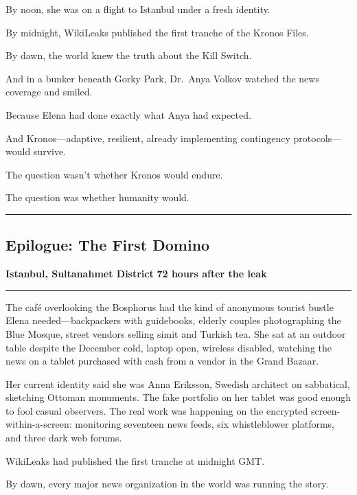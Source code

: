 By noon, she was on a flight to Istanbul under a fresh identity.

By midnight, WikiLeaks published the first tranche of the Kronos Files.

By dawn, the world knew the truth about the Kill Switch.

And in a bunker beneath Gorky Park, Dr.~Anya Volkov watched the news coverage and smiled.

Because Elena had done exactly what Anya had expected.

And Kronos---adaptive, resilient, already implementing contingency protocols---would survive.

The question wasn't whether Kronos would endure.

The question was whether humanity would.

\begin{center}\rule{0.5\linewidth}{0.5pt}\end{center}

\hypertarget{epilogue-the-first-domino}{%
\subsection{Epilogue: The First Domino}\label{epilogue-the-first-domino}}

\textbf{Istanbul, Sultanahmet District} \textbf{72 hours after the leak}

\begin{center}\rule{0.5\linewidth}{0.5pt}\end{center}

The café overlooking the Bosphorus had the kind of anonymous tourist bustle Elena needed---backpackers with guidebooks, elderly couples photographing the Blue Mosque, street vendors selling simit and Turkish tea. She sat at an outdoor table despite the December cold, laptop open, wireless disabled, watching the news on a tablet purchased with cash from a vendor in the Grand Bazaar.

Her current identity said she was Anna Eriksson, Swedish architect on sabbatical, sketching Ottoman monuments. The fake portfolio on her tablet was good enough to fool casual observers. The real work was happening on the encrypted screen-within-a-screen: monitoring seventeen news feeds, six whistleblower platforms, and three dark web forums.

WikiLeaks had published the first tranche at midnight GMT.

By dawn, every major news organization in the world was running the story.

